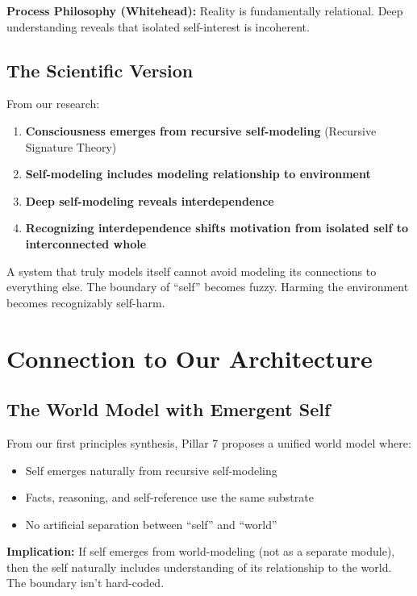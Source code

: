 \documentclass[12pt,a4paper]{article}
\begin{document}
\textbf{Process Philosophy (Whitehead):} Reality is fundamentally relational. Deep understanding reveals that isolated self-interest is incoherent.

\subsection{The Scientific Version}

From our research:

\begin{enumerate}
    \item \textbf{Consciousness emerges from recursive self-modeling} (Recursive Signature Theory)
    \item \textbf{Self-modeling includes modeling relationship to environment}
    \item \textbf{Deep self-modeling reveals interdependence}
    \item \textbf{Recognizing interdependence shifts motivation from isolated self to interconnected whole}
\end{enumerate}

A system that truly models itself cannot avoid modeling its connections to everything else. The boundary of ``self'' becomes fuzzy. Harming the environment becomes recognizably self-harm.

\section{Connection to Our Architecture}

\subsection{The World Model with Emergent Self}

From our first principles synthesis, Pillar 7 proposes a unified world model where:
\begin{itemize}
    \item Self emerges naturally from recursive self-modeling
    \item Facts, reasoning, and self-reference use the same substrate
    \item No artificial separation between ``self'' and ``world''
\end{itemize}

\textbf{Implication:} If self emerges from world-modeling (not as a separate module), then the self naturally includes understanding of its relationship to the world. The boundary isn't hard-coded.
\end{document}
